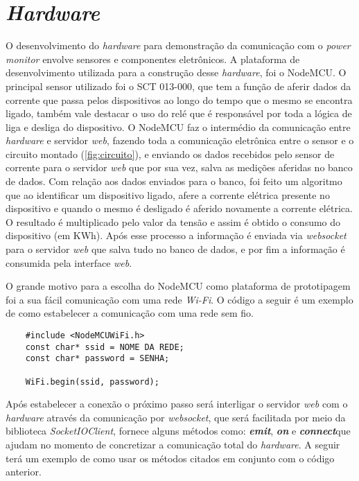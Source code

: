 \section[\textit{Hardware}]{\textit{Hardware}}\label{hard-sec}
O desenvolvimento do \textit{hardware} para demonstração da comunicação com o \textit{power monitor} envolve sensores e componentes
eletrônicos. A plataforma de desenvolvimento utilizada para a construção desse \textit{hardware}, foi o NodeMCU. O principal sensor
utilizado foi o SCT 013-000, que tem a função de aferir dados da corrente que passa pelos dispositivos ao longo do tempo que o mesmo se encontra
ligado, também vale destacar o uso do relé que é responsável por toda a lógica de liga e desliga do dispositivo. O NodeMCU faz o intermédio da comunicação entre 
\textit{hardware} e servidor \textit{web}, fazendo toda a comunicação eletrônica entre o sensor e o circuito montado (\autoref{fig:circuito}), e enviando os dados
recebidos pelo sensor de corrente para o servidor \textit{web} que por sua vez, salva as medições aferidas no banco de dados. Com relação aos dados enviados 
para o banco, foi feito um algoritmo que ao identificar um dispositivo ligado, afere a corrente elétrica presente no dispositivo e quando o mesmo é desligado 
é aferido novamente a corrente elétrica. O resultado é multiplicado pelo valor da tensão
e assim é obtido o consumo do dispositivo (em KWh). Após esse processo a informação é enviada via \textit{websocket} 
para o servidor \textit{web} que salva tudo no banco de dados, e por fim a informação é consumida pela interface \textit{web}.

O grande motivo para a escolha do NodeMCU como plataforma de prototipagem foi a sua fácil comunicação com uma rede
\textit{Wi-Fi}. O código a seguir é um exemplo de como estabelecer a comunicação com uma rede sem fio.

\newpage

\begin{lstlisting}
	#include <NodeMCUWiFi.h>
	const char* ssid = NOME DA REDE;
	const char* password = SENHA;
	
	WiFi.begin(ssid, password);
\end{lstlisting}

Após estabelecer a conexão o próximo passo será interligar o servidor \textit{web} com o \textit{hardware} através da comunicação por \textit{websocket},
que será facilitada por meio da biblioteca \textit{SocketIOClient}, fornece alguns métodos como: \textit{\textbf{emit}}\protect\footnotemark, \textit{\textbf{on}}\protect\footnotemark 
e \textit{\textbf{connect}}\protect\footnotemark  que ajudam no momento de concretizar a comunicação total do \textit{hardware}. A seguir terá um
exemplo de como usar os métodos citados em conjunto com o código anterior.

